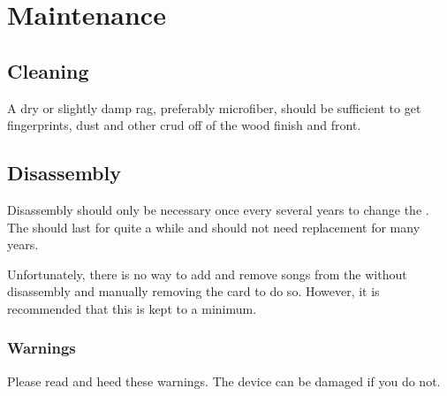 \part{Maintenance} \label{Maintenance}

\chapter{Cleaning} \label{Cleaning}

A dry or slightly damp rag, preferably microfiber, should be sufficient to get
fingerprints, dust and other crud off of the wood finish and \front{} front.


\chapter{Disassembly} \label{Disassembly}

Disassembly should only be necessary once every several years to change the
.  The  should last for quite a while and should not need
replacement for many years.

\par\medskip

Unfortunately, there is no way to add and remove songs from the  without
disassembly and manually removing the card to do so.  However, it is recommended
that this is kept to a minimum.

\section{Warnings}

Please read and heed these warnings.  The device can be damaged if you do not.

